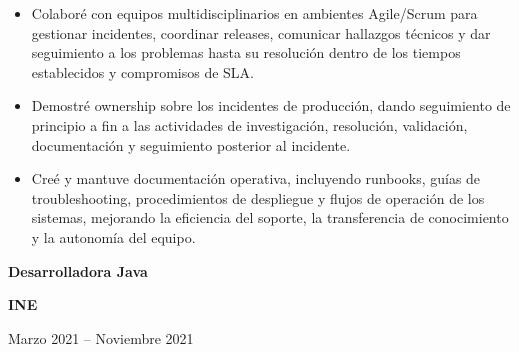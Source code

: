 \documentclass[10pt,letterpaper]{article}
\newcommand{\jobtitle}[1]{
    {\bfseries #1}
}
\newcommand{\company}[1]{
    {\bfseries\color{DarkGray} #1}
}
\newcommand{\jobdate}[1]{
    {\color{MediumGray} #1}
}
\begin{document}
\begin{itemize}
\item Colaboré con equipos multidisciplinarios en ambientes Agile/Scrum para gestionar incidentes, coordinar releases, comunicar hallazgos técnicos y dar seguimiento a los problemas hasta su resolución dentro de los tiempos establecidos y compromisos de SLA.

\item Demostré ownership sobre los incidentes de producción, dando seguimiento de principio a fin a las actividades de investigación, resolución, validación, documentación y seguimiento posterior al incidente.

\item Creé y mantuve documentación operativa, incluyendo runbooks, guías de troubleshooting, procedimientos de despliegue y flujos de operación de los sistemas, mejorando la eficiencia del soporte, la transferencia de conocimiento y la autonomía del equipo.

\end{itemize}


\jobtitle{Desarrolladora Java} \textbar{}
\company{INE}
\hfill \textbar{}
\jobdate{Marzo 2021 -- Noviembre 2021}
\end{document}
